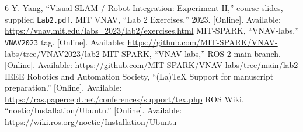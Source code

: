 \documentclass[letterpaper,10pt,conference]{ieeeconf}
\begin{document}
\begin{thebibliography}{6}
 Y. Yang, ``Visual SLAM / Robot Integration: Experiment II,'' course slides, supplied \texttt{Lab2.pdf}.
 MIT VNAV, ``Lab 2 Exercises,'' 2023. [Online]. Available: \url{https://vnav.mit.edu/labs_2023/lab2/exercises.html}
 MIT-SPARK, ``VNAV-labs,'' \texttt{VNAV2023} tag. [Online]. Available: \url{https://github.com/MIT-SPARK/VNAV-labs/tree/VNAV2023/lab2}
 MIT-SPARK, ``VNAV-labs,'' ROS 2 main branch. [Online]. Available: \url{https://github.com/MIT-SPARK/VNAV-labs/tree/main/lab2}
 IEEE Robotics and Automation Society, ``(La)TeX Support for manuscript preparation.'' [Online]. Available: \url{https://ras.papercept.net/conferences/support/tex.php}
 ROS Wiki, ``noetic/Installation/Ubuntu.'' [Online]. Available: \url{https://wiki.ros.org/noetic/Installation/Ubuntu}
\end{thebibliography}
\end{document}
